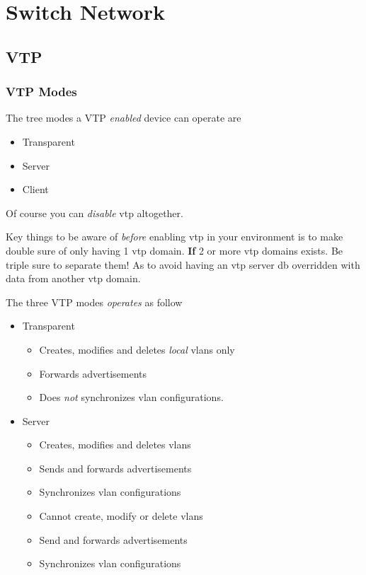 \section{Switch Network}

\subsection{VTP}

\subsubsection{VTP Modes}
The tree modes a VTP \textit{enabled} device can operate are
\begin{itemize}
    \item Transparent
    \item Server
    \item Client
\end{itemize}
Of course you can \textit{disable} \acrshort{vtp} altogether.

Key things to be aware of \textit{before} enabling \acrshort{vtp} in your environment is to make double sure of only having 1 \acrshort{vtp} domain. \textbf{If} 2 or more \acrshort{vtp} domains exists. Be triple sure to separate them! As to avoid having an \acrshort{vtp} server \acrshort{db} overridden with data from another \acrshort{vtp} domain.

The three VTP modes \textit{operates} as follow
\begin{itemize}
    \item Transparent
    \begin{itemize}
        \item Creates, modifies and deletes \textit{local} vlans only
        \item Forwards advertisements
        \item Does \textit{not} synchronizes vlan configurations.
    \end{itemize}
    \item Server
    \begin{itemize}
        \item Creates, modifies and deletes vlans
        \item Sends and forwards advertisements
        \item Synchronizes vlan configurations
    \end{itemize}
    \begin{itemize}
        \item Cannot create, modify or delete vlans
        \item Send and forwards advertisements
        \item Synchronizes vlan configurations
    \end{itemize}
\end{itemize}

